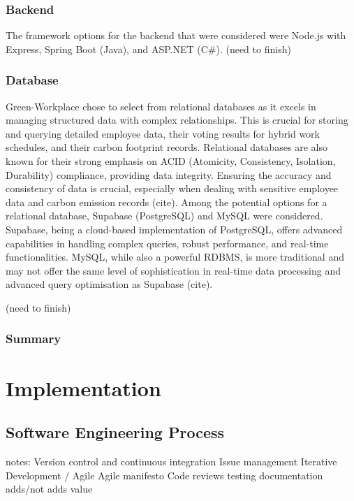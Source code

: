 \documentclass{l4proj}
\begin{document}
\subsection{Backend}

The framework options for the backend that were considered were Node.js with Express, Spring Boot (Java), and ASP.NET (C\#). (need to finish)


\subsection{Database}
Green-Workplace chose to select from relational databases as it excels in managing structured data with complex relationships. This is crucial for storing and querying detailed employee data, their voting results for hybrid work schedules, and their carbon footprint records. Relational databases are also known for their strong emphasis on ACID (Atomicity, Consistency, Isolation, Durability) compliance, providing data integrity. Ensuring the accuracy and consistency of data is crucial, especially when dealing with sensitive employee data and carbon emission records (cite). Among the potential options for a relational database, Supabase (PostgreSQL) and MySQL were considered. Supabase, being a cloud-based implementation of PostgreSQL, offers advanced capabilities in handling complex queries, robust performance, and real-time functionalities. MySQL, while also a powerful RDBMS, is more traditional and may not offer the same level of sophistication in real-time data processing and advanced query optimisation as Supabase (cite).

(need to finish)

\subsection{Summary}

\chapter{Implementation}

\section{Software Engineering Process}
notes: Version control and continuous integration
Issue management
Iterative Development / Agile
Agile manifesto
Code reviews
testing 
documentation
adds/not adds value
\end{document}

